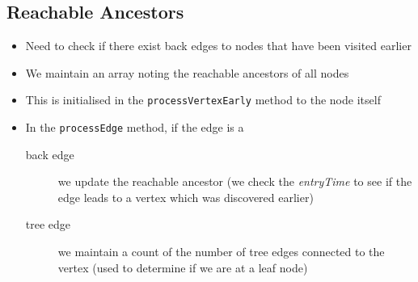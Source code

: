 
\begin{slide}
\section[-2]{Reachable Ancestors}

\begin{PauseHighLight}
  \begin{itemize}\squeeze
  \item Need to check if there exist back edges to nodes that have been
    visited earlier\pause
  \item We maintain an array noting the reachable ancestors of all nodes\pause
  \item This is initialised in the \texttt{processVertexEarly} method
    to the node itself\pause
  \item In the \texttt{processEdge} method, if the edge is a
    \begin{description}
    \item[back edge] we update the reachable ancestor (we check the
      \textit{entryTime} to see if the edge leads to a vertex which was
      discovered earlier)\pause
    \item[tree edge] we maintain a count of the number of tree edges
      connected to the vertex (used to determine if we are at a leaf
      node)\pause
    \end{description}
  \end{itemize}
\end{PauseHighLight}

\end{slide}



